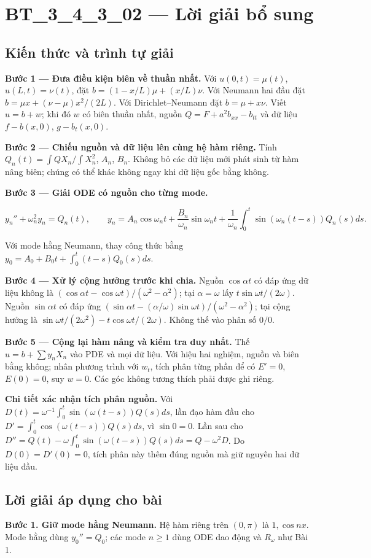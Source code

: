 \documentclass[10pt,a4paper]{article}
\begin{document}
\section*{BT\_3\_4\_3\_02 — Lời giải bổ sung}
\subsection*{Kiến thức và trình tự giải}
\textbf{Bước 1 — Đưa điều kiện biên về thuần nhất.} Với $u(0,t)=\mu(t)$, $u(L,t)=\nu(t)$, đặt $b=(1-x/L)\mu+(x/L)\nu$. Với Neumann hai đầu đặt $b=\mu x+(\nu-\mu)x^2/(2L)$. Với Dirichlet–Neumann đặt $b=\mu+x\nu$. Viết $u=b+w$; khi đó $w$ có biên thuần nhất, nguồn $Q=F+a^2b_{xx}-b_{tt}$ và dữ liệu $f-b(x,0)$, $g-b_t(x,0)$.

\textbf{Bước 2 — Chiếu nguồn và dữ liệu lên cùng hệ hàm riêng.} Tính $Q_n(t)=\int QX_n/\int X_n^2$, $A_n$, $B_n$. Không bỏ các dữ liệu mới phát sinh từ hàm nâng biên; chúng có thể khác không ngay khi dữ liệu gốc bằng không.

\textbf{Bước 3 — Giải ODE có nguồn cho từng mode.}


\[
y_n''+\omega_n^2y_n=Q_n(t),\qquad
y_n=A_n\cos\omega_nt+\frac{B_n}{\omega_n}\sin\omega_nt+\frac1{\omega_n}\int_0^t\sin(\omega_n(t-s))Q_n(s)ds.
\]


Với mode hằng Neumann, thay công thức bằng $y_0=A_0+B_0t+\int_0^t(t-s)Q_0(s)ds$.

\textbf{Bước 4 — Xử lý cộng hưởng trước khi chia.} Nguồn $\cos\alpha t$ có đáp ứng dữ liệu không là $(\cos\alpha t-\cos\omega t)/(\omega^2-\alpha^2)$; tại $\alpha=\omega$ lấy $t\sin\omega t/(2\omega)$. Nguồn $\sin\alpha t$ có đáp ứng $(\sin\alpha t-(\alpha/\omega)\sin\omega t)/(\omega^2-\alpha^2)$; tại cộng hưởng là $\sin\omega t/(2\omega^2)-t\cos\omega t/(2\omega)$. Không thế vào phân số $0/0$.

\textbf{Bước 5 — Cộng lại hàm nâng và kiểm tra duy nhất.} Thế $u=b+\sum y_nX_n$ vào PDE và mọi dữ liệu. Với hiệu hai nghiệm, nguồn và biên bằng không; nhân phương trình với $w_t$, tích phân từng phần để có $E'=0$, $E(0)=0$, suy $w=0$. Các góc không tương thích phải được ghi riêng.

\textbf{Chi tiết xác nhận tích phân nguồn.} Với $D(t)=\omega^{-1}\int_0^t\sin(\omega(t-s))Q(s)ds$, lần đạo hàm đầu cho $D'=\int_0^t\cos(\omega(t-s))Q(s)ds$, vì $\sin0=0$. Lần sau cho $D''=Q(t)-\omega\int_0^t\sin(\omega(t-s))Q(s)ds=Q-\omega^2D$. Do $D(0)=D'(0)=0$, tích phân này thêm đúng nguồn mà giữ nguyên hai dữ liệu đầu.
\subsection*{Lời giải áp dụng cho bài}
\textbf{Bước 1. Giữ mode hằng Neumann.} Hệ hàm riêng trên $(0,\pi)$ là $1,\cos nx$. Mode hằng dùng $y_0''=Q_0$; các mode $n\ge1$ dùng ODE dao động và $R_\omega$ như Bài 1.
\end{document}
